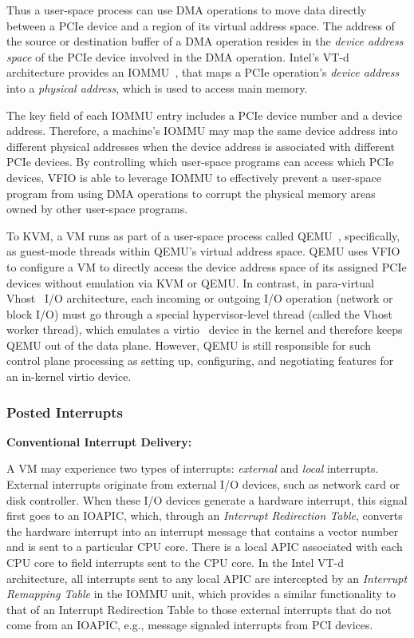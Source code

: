 Thus a user-space process can use DMA operations to move data directly between a PCIe device and
a region of its virtual address space.
The address of the source or destination buffer of a DMA operation resides in
the {\em device address space} of the PCIe device involved in the DMA operation.
Intel's VT-d architecture provides an IOMMU~\cite{ben:2006}, that maps a
PCIe operation's {\em device address} into a {\em physical address},
which is used to access main memory.

The key field of each IOMMU entry includes a PCIe device number and a device address.
Therefore, a machine's IOMMU may map the same device address into different physical addresses when the device address is associated with different PCIe devices.
By controlling which user-space programs can access which PCIe devices, VFIO is able to leverage IOMMU to effectively prevent a user-space program
from using DMA operations to corrupt the physical memory areas owned by other user-space programs.

To KVM, a VM runs as part of a user-space process  called QEMU~\cite{qemu},
specifically, as guest-mode threads within QEMU's virtual address space.
QEMU uses VFIO to configure a VM to directly access the device address space of
its assigned PCIe devices without emulation via KVM or QEMU.
In contrast, in para-virtual Vhost~\cite{vhost-net} I/O architecture,
each incoming or outgoing I/O operation (network or block I/O) must go through
a special hypervisor-level thread (called the Vhost worker thread),
which emulates a virtio~\cite{russell:2008} device in the kernel and
therefore keeps QEMU out of the data plane.
However, QEMU is still responsible for such control plane processing as setting up,
configuring, and negotiating features for an in-kernel virtio device.


\subsubsection{Posted Interrupts}

{\bf Conventional Interrupt Delivery:}

A VM may experience two types of interrupts: {\em external} and {\em local} interrupts.
External interrupts originate from external I/O devices, such as network card or disk controller.
When these I/O devices generate a hardware interrupt, this signal first goes to an IOAPIC, which, through an {\em Interrupt Redirection Table},
converts the hardware interrupt into an interrupt message that contains a vector number and is sent to a particular CPU core.
There is a local APIC associated with each CPU core to field interrupts sent to the CPU core.
In the Intel VT-d architecture, all interrupts sent to any local APIC are intercepted by  an {\em Interrupt Remapping Table} in the IOMMU unit,
which provides a similar functionality to that of an Interrupt Redirection Table
to those external interrupts that do not come from an IOAPIC, e.g., message signaled interrupts from PCI devices.

